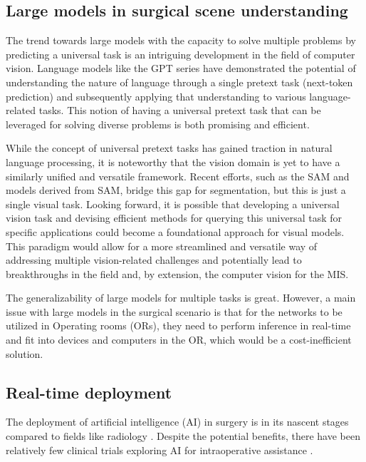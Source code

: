 \documentclass[times,twocolumn,final]{elsarticle}
\begin{document}
\subsection{Large models in surgical scene understanding}
The trend towards large models with the capacity to solve multiple problems by predicting a universal task is an intriguing development in the field of computer vision. Language models like the GPT series \citep{radford2019language}  have demonstrated the potential of understanding the nature of language through a single pretext task (next-token prediction) and subsequently applying that understanding to various language-related tasks. This notion of having a universal pretext task that can be leveraged for solving diverse problems is both promising and efficient.

While the concept of universal pretext tasks has gained traction in natural language processing, it is noteworthy that the vision domain is yet to have a similarly unified and versatile framework. Recent efforts, such as the SAM \citep{kirillov2023segment} and models derived from SAM, bridge this gap for segmentation, but this is just a single visual task. Looking forward, it is possible that developing a universal vision task and devising efficient methods for querying this universal task for specific applications could become a foundational approach for visual models. This paradigm would allow for a more streamlined and versatile way of addressing multiple vision-related challenges and potentially lead to breakthroughs in the field and, by extension, the computer vision for the MIS.

The generalizability of large models for multiple tasks is great. However, a main issue with large models in the surgical scenario is that for the networks to be utilized in Operating rooms (ORs), they need to perform inference in real-time and fit into devices and computers in the OR, which would be a cost-inefficient solution.

\subsection{Real-time deployment}
The deployment of artificial intelligence (AI) in surgery is in its nascent stages compared to fields like radiology \citep{maier2022surgical}. Despite the potential benefits, there have been relatively few clinical trials exploring AI for intraoperative assistance \citep{varghese2024artificial,auloge2020augmented,mascagni2024early}.
\end{document}
